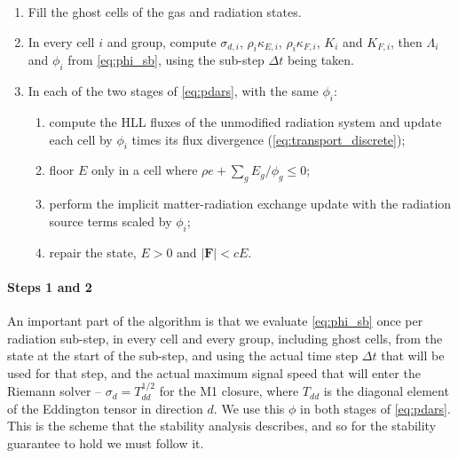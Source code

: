 \documentclass[preprint,12pt,authoryear]{elsarticle}
\newcommand{\vecF}{\mathbf{F}}
\begin{document}
\begin{algorithm}[t]
\caption{One radiation sub-step of the ARSA.}
\label{alg:arsa}
\begin{enumerate}
    \item Fill the ghost cells of the gas and radiation states.
    \item In every cell $i$ and group, compute $\sigma_{d,i}$, $\rho_i\kappa_{E,i}$, $\rho_i\kappa_{F,i}$, $K_i$ and $K_{F,i}$, then $\Lambda_i$ and $\phi_i$ from \autoref{eq:phi_sb}, using the sub-step $\Delta t$ being taken.
    \item In each of the two stages of \autoref{eq:pdars}, with the same $\phi_i$:
    \begin{enumerate}
        \item compute the HLL fluxes of the unmodified radiation system and update each cell by $\phi_i$ times its flux divergence (\autoref{eq:transport_discrete});
        \item floor $E$ only in a cell where $\rho e + \sum_g E_g/\phi_g \leq 0$;
        \item perform the implicit matter-radiation exchange update with the radiation source terms scaled by $\phi_i$;
        \item repair the state, $E > 0$ and $|\vecF| < cE$.
    \end{enumerate}
\end{enumerate}
\end{algorithm}

\paragraph{Steps 1 and 2} An important part of the algorithm is that we evaluate \autoref{eq:phi_sb} once per radiation sub-step, in every cell and every group, including ghost cells, from the state at the start of the sub-step, and using the actual time step $\Delta t$ that will be used for that step, and the actual maximum signal speed that will enter the Riemann solver -- $\sigma_d = T_{dd}^{1/2}$ for the M1 closure, where $T_{dd}$ is the diagonal element of the Eddington tensor in direction $d$. We use this $\phi$ in both stages of \autoref{eq:pdars}. This is the scheme that the stability analysis describes, and so for the stability guarantee to hold we must follow it.
\end{document}
